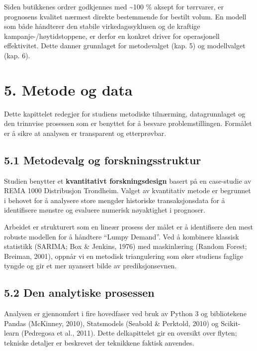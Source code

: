 \documentclass[
  norsk,
  11pt,
  a4paper,
]{article}
\begin{document}
Siden butikkenes ordrer godkjennes med \textasciitilde100 \% aksept for
tørrvarer, er prognosens kvalitet nærmest direkte bestemmende for
bestilt volum. En modell som både håndterer den stabile
virkedagssyklusen og de kraftige kampanje-/høytidstoppene, er derfor en
konkret driver for operasjonell effektivitet. Dette danner grunnlaget
for metodevalget (kap. 5) og modellvalget (kap. 6).

\section{5. Metode og data}\label{metode-og-data}

Dette kapittelet redegjør for studiens metodiske tilnærming,
datagrunnlaget og den trinnvise prosessen som er benyttet for å besvare
problemstillingen. Formålet er å sikre at analysen er transparent og
etterprøvbar.

\subsection{5.1 Metodevalg og
forskningsstruktur}\label{metodevalg-og-forskningsstruktur}

Studien benytter et \textbf{kvantitativt forskningsdesign} basert på en
case-studie av REMA 1000 Distribusjon Trondheim. Valget av kvantitativ
metode er begrunnet i behovet for å analysere store mengder historiske
transaksjonsdata for å identifisere mønstre og evaluere numerisk
nøyaktighet i prognoser.

Arbeidet er strukturert som en lineær prosess der målet er å
identifisere den mest robuste modellen for å håndtere ``Lumpy Demand''.
Ved å kombinere klassisk statistikk (SARIMA; Box \& Jenkins, 1976) med
maskinlæring (Random Forest; Breiman, 2001), oppnår vi en metodisk
triangulering som øker studiens faglige tyngde og gir et mer nyansert
bilde av prediksjonsevnen.

\subsection{5.2 Den analytiske
prosessen}\label{den-analytiske-prosessen}

Analysen er gjennomført i fire hovedfaser ved bruk av Python 3 og
bibliotekene Pandas (McKinney, 2010), Statsmodels (Seabold \& Perktold,
2010) og Scikit-learn (Pedregosa et al., 2011). Dette delkapittelet gir
en oversikt over flyten; tekniske detaljer er beskrevet der teknikkene
faktisk anvendes.
\end{document}
